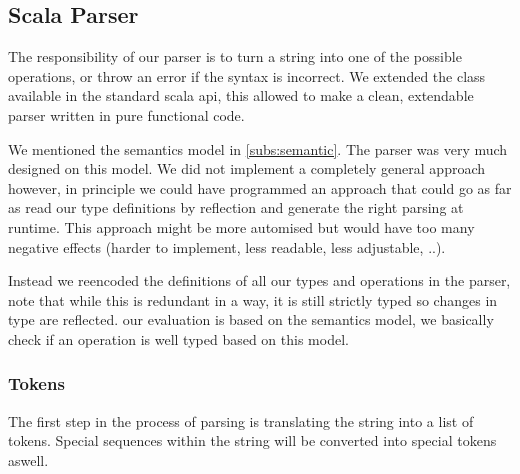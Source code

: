 \subsection{Scala Parser}

The responsibility of our parser is to turn a string into one of the possible
operations, or throw an error if the syntax is incorrect. We extended the
 class available in the standard scala api, this
allowed to make a clean, extendable parser written in pure functional code.

\par
We mentioned the semantics model in \ref{subs:semantic}. The parser was very
much designed on this model. We did not implement a completely general approach
however, in principle we could have programmed an approach that could go
as far as read our type definitions by reflection and generate the right parsing
at runtime. This approach might be more automised but would have too many
negative effects (harder to implement, less readable, less adjustable, ..).

\par
Instead we reencoded the definitions of all our types and operations in the
parser, note that while this is redundant in a way, it is still strictly typed
so changes in type are reflected. our evaluation is based on the semantics
model, we basically check if an operation is well typed based on this model.


\subsubsection{Tokens} 

The first step in the process of parsing is translating the string into a list
of tokens. Special sequences within the string will be converted into special
tokens aswell.

